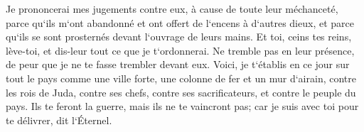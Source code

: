 \verse Je prononcerai mes jugements contre eux, à cause de toute leur méchanceté, parce qu`ils m`ont abandonné et ont offert de l`encens à d`autres dieux, et parce qu`ils se sont prosternés devant l`ouvrage de leurs mains. 
\verse Et toi, ceins tes reins, lève-toi, et dis-leur tout ce que je t`ordonnerai. Ne tremble pas en leur présence, de peur que je ne te fasse trembler devant eux. 
\verse Voici, je t`établis en ce jour sur tout le pays comme une ville forte, une colonne de fer et un mur d`airain, contre les rois de Juda, contre ses chefs, contre ses sacrificateurs, et contre le peuple du pays. 
\verse Ils te feront la guerre, mais ils ne te vaincront pas; car je suis avec toi pour te délivrer, dit l`Éternel. 

\chapter{}

